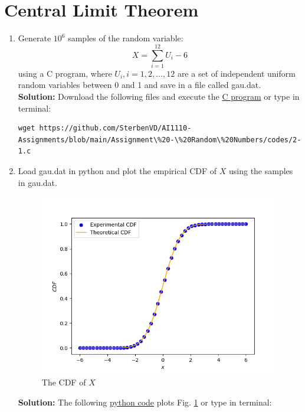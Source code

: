 \documentclass[journal,12pt,twocolumn]{IEEEtran}
\numberwithin{equation}{section}
\renewcommand\thesection{\arabic{section}}
\providecommand{\gitlink}[2]{{\color{blue}\href{https://github.com/SterbenVD/AI1110-Assignments/blob/main/Assignment\%20-\%20Random\%20Numbers/#1}{#2}}}
\newcommand{\solution}{\noindent \textbf{Solution: }}
\begin{document}
\section{Central Limit Theorem}
\begin{enumerate}[label=\thesection.\arabic*,ref=\thesection.\theenumi]
    \item Generate $10^6$ samples of the random variable:
          \begin{equation}
              X = \sum_{i=1}^{12}U_i -6
          \end{equation}
          using a C program, where $U_i, i = 1,2,\dots, 12$ are  a set of independent uniform random variables between 0 and 1
          and save in a file called gau.dat.
          \\
          \solution Download the following files and execute the \gitlink{codes/2-1.c}{C program} or type in terminal:
          \begin{lstlisting}
wget https://github.com/SterbenVD/AI1110-Assignments/blob/main/Assignment\%20-\%20Random\%20Numbers/codes/2-1.c
            \end{lstlisting}
    \item Load gau.dat in python and plot the empirical CDF of $X$ using the samples in gau.dat.
          \begin{figure}[H]
              \centering
              \includegraphics[width = \columnwidth]{../figs/2_cdf}
              \caption{The CDF of $X$}
              \label{fig:2_cdf}
          \end{figure}
          \solution The following \gitlink{codes/2-2.py}{python code} plots Fig. \ref{fig:2_cdf}  or type in terminal:

\end{enumerate}
\end{document}
